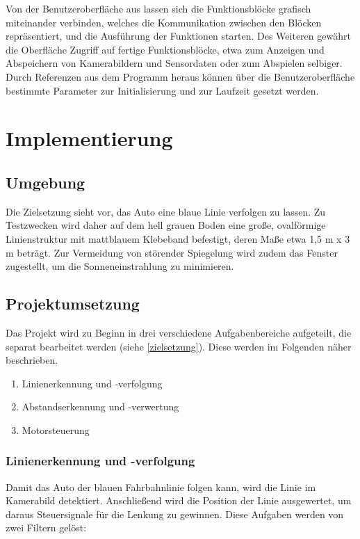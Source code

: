 \documentclass[12pt, a4paper]{scrartcl}
\begin{document}
Von der Benutzeroberfläche aus lassen sich die Funktionsblöcke grafisch miteinander verbinden, welches die Kommunikation zwischen den Blöcken repräsentiert, und die Ausführung der Funktionen starten. Des Weiteren gewährt die Oberfläche Zugriff auf fertige Funktionsblöcke, etwa zum Anzeigen und Abspeichern von Kamerabildern und Sensordaten oder zum  Abspielen selbiger.
Durch Referenzen aus dem Programm heraus können über die Benutzeroberfläche bestimmte Parameter zur Initialisierung und zur Laufzeit gesetzt werden.


\newpage
\section{Implementierung}

\subsection{Umgebung}

Die Zielsetzung sieht vor, das Auto eine blaue Linie verfolgen zu lassen. Zu Testzwecken wird daher auf dem hell grauen Boden eine große, ovalförmige Linienstruktur mit mattblauem Klebeband befestigt, deren Maße etwa 1,5 m x 3 m beträgt. Zur Vermeidung von störender Spiegelung wird zudem das Fenster zugestellt, um die Sonneneinstrahlung zu minimieren.

\subsection{Projektumsetzung}

Das Projekt wird zu Beginn in drei verschiedene Aufgabenbereiche aufgeteilt, die separat bearbeitet werden (siehe \autoref{zielsetzung}). Diese werden im Folgenden näher beschrieben.

\begin{enumerate}
	\item Linienerkennung und -verfolgung
	\item Abstandserkennung und -verwertung
	\item Motorsteuerung
\end{enumerate}

\subsubsection{Linienerkennung und -verfolgung}
Damit das Auto der blauen Fahrbahnlinie folgen kann, wird die Linie im Kamerabild detektiert. Anschließend wird die Position der Linie ausgewertet, um daraus Steuersignale für die Lenkung zu gewinnen. Diese Aufgaben werden von zwei Filtern gelöst:
\end{document}
